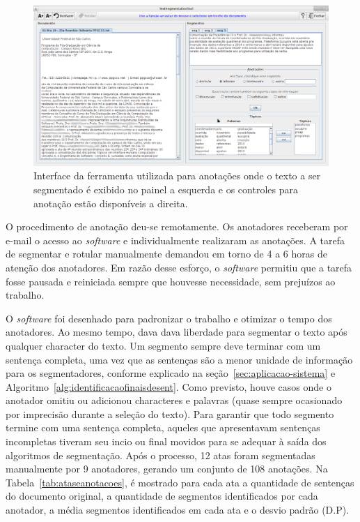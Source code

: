   \begin{figure}[!h]
	  \centering
	  \includegraphics[width=1\textwidth]{conteudo/capitulos/figs/interface-TST.png}
	  \caption{Interface da ferramenta utilizada para anotações onde o texto a ser segmentado é exibido no painel a esquerda e os controles para anotação estão disponíveis a direita.}
	  \label{fig:interfaceanotacoes}
  \end{figure}



O procedimento de anotação deu-se remotamente. Os anotadores receberam por e-mail o acesso ao \textit{software} e individualmente realizaram as anotações. A tarefa de segmentar e rotular manualmente demandou em torno de 4 a 6 horas de atenção dos anotadores. Em razão desse esforço, o \textit{software} permitiu que a tarefa fosse pausada e reiniciada sempre que houvesse necessidade, sem prejuízos ao trabalho.

O \textit{software} foi desenhado para padronizar o trabalho e otimizar o tempo dos anotadores. Ao mesmo tempo, dava dava liberdade para segmentar o texto após qualquer character do texto. Um segmento sempre deve terminar com um sentença completa, uma vez que as sentenças são a menor unidade de informação para os segmentadores, conforme explicado na seção~\ref{sec:aplicacao-sistema} e Algoritmo~\ref{alg:identificacaofinaisdesent}. Como previsto, houve casos onde o anotador omitiu ou adicionou characteres e palavras (quase sempre ocasionado por imprecisão durante a seleção do texto). Para garantir que todo segmento termine com uma sentença completa, aqueles que apresentavam sentenças incompletas tiveram seu incio ou final movidos para se adequar à saída dos algoritmos de segmentação. Após o processo, 12 atas foram segmentadas manualmente por 9 anotadores, gerando um conjunto de 108 anotações. Na Tabela~\ref{tab:ataseanotacoes}, é mostrado para cada ata a quantidade de sentenças do documento original, a quantidade de segmentos identificados por cada anotador, a média segmentos identificados em cada ata e o desvio padrão (D.P).



